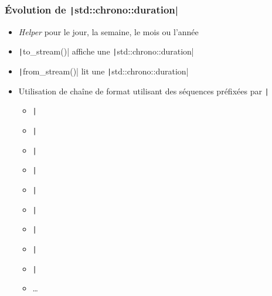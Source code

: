 \documentclass[C++.tex]{subfiles}
\begin{document}
\begin{frame}[fragile]
	\frametitle{Évolution de \texttt|std::chrono::duration|}
	\begin{itemize}
		\item \textit{Helper} pour le jour, la semaine, le mois ou l'année
		\item \texttt|to_stream()| affiche une \texttt|std::chrono::duration|
		\item \texttt|from_stream()| lit une \texttt|std::chrono::duration|
		\item Utilisation de chaîne de format utilisant des séquences préfixées par \texttt|%
		\begin{itemize}
			\item \texttt|%
			\item \texttt|%
			\item \texttt|%
			\item \texttt|%
			\item \texttt|%
			\item \texttt|%
			\item \texttt|%
			\item \texttt|%
			\item \texttt|%
			\item \ldots{}

		\end{itemize}
	\end{itemize}

\end{frame}
\end{document}
